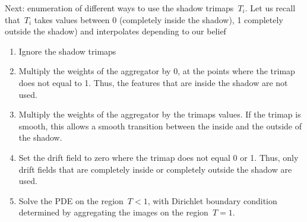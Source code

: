 \documentclass{article}
\begin{document}
\bigskip

Next: enumeration of different ways to use the shadow trimaps~$T_i$.  Let us
recall that~$T_i$ takes values between 0 (completely inside the shadow), 1
completely outside the shadow) and interpolates depending to our belief 

\begin{enumerate}
	\item Ignore the shadow trimaps
	\item Multiply the weights of the aggregator by 0, at the points
		where the trimap does not equal to 1.  Thus, the features
		that are inside the shadow are not used.
	\item Multiply the weights of the aggregator by the trimaps values.
		If the trimap is smooth, this allows a smooth transition
		between the inside and the outside of the shadow.
	\item Set the drift field to zero where the trimap does not equal 0
		or 1.  Thus, only drift fields that are completely inside or
		completely outside the shadow are used.
	\item Solve the PDE on the region~$T<1$, with Dirichlet boundary
		condition determined by aggregating the images on the
		region~$T=1$.
\end{enumerate}
\end{document}
